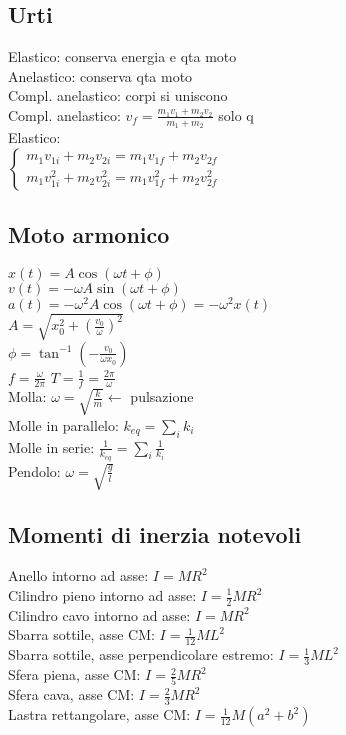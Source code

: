 \documentclass[8pt]{scrreprt}
\begin{document}
\begin{multicols*}{3}
\subsection*{Urti}
Elastico: conserva energia e qta moto\\
Anelastico: conserva qta moto\\
Compl. anelastico: corpi si uniscono\\
Compl. anelastico: $v_f = \frac{m_1 v_1 + m_2 v_2}{m_1 + m_2}$ solo q\\
Elastico:\\
$\left\{ \begin{array}{ll} m_1 v_{1i} + m_2 v_{2i} = m_1 v_{1f} + m_2 v_{2f} \\ m_1 v_{1i}^2 + m_2 v_{2i}^2 = m_1 v_{1f}^2 + m_2 v_{2f}^2 \end{array} \right.$

\vspace{-3mm}
\subsection*{Moto armonico}
$x(t) = A \cos(\omega t + \phi)$\\
$v(t) = -\omega A \sin(\omega t + \phi)$\\
$a(t) = -\omega^2 A \cos(\omega t + \phi) = -\omega^2 x(t)$\\
$A = \sqrt{x_0^2 + \left(\frac{v_0}{\omega}\right)^2}$\\
$\phi = \tan^{-1} \left(-\frac{v_0}{\omega x_0}\right)$\\
$f = \frac{\omega}{2\pi}$ \quad $T = \frac{1}{f} = \frac{2\pi}{\omega}$\\
Molla: $\omega = \sqrt{\frac{k}{m}}\leftarrow$ pulsazione\\
Molle in parallelo: $k_{eq} = \sum_i k_i$\\
Molle in serie: $\frac{1}{k_{eq}} = \sum_i \frac{1}{k_i}$\\
Pendolo: $\omega = \sqrt{\frac{g}{l}}$

\vspace{-3mm}
\subsection*{Momenti di inerzia notevoli}
Anello intorno ad asse: $I = MR^2$\\
Cilindro pieno intorno ad asse: $I = \frac{1}{2}MR^2$\\
Cilindro cavo intorno ad asse: $I = MR^2$\\
Sbarra sottile, asse CM: $I = \frac{1}{12}ML^2$\\
Sbarra sottile, asse perpendicolare estremo: $I = \frac{1}{3}ML^2$\\
Sfera piena, asse CM: $I = \frac{2}{5}MR^2$\\
Sfera cava, asse CM: $I = \frac{2}{3}MR^2$\\
Lastra rettangolare, asse CM: $I = \frac{1}{12}M(a^2 + b^2)$


\end{multicols*}
\end{document}
